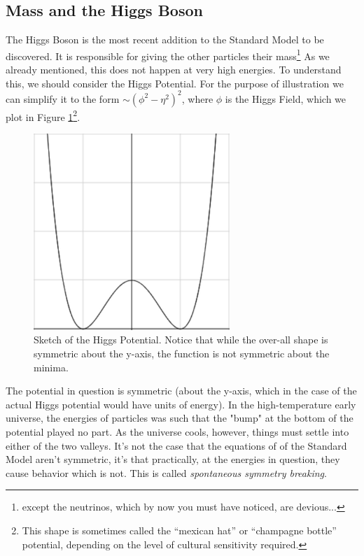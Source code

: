 \subsection{Mass and the Higgs Boson}
The Higgs Boson is the most recent addition to the Standard Model to be discovered. It is responsible for giving the other particles their mass\footnote{except the neutrinos, which by now you must have noticed, are devious...} As we already mentioned, this does not happen at very high energies. To understand this, we should consider the Higgs Potential. For the purpose of illustration we can simplify it to the form $\sim (\phi^2 - \eta^2)^2$, where $\phi$ is the Higgs Field, which we plot in Figure \ref{Fig:Intro:HiggsPot}\footnote{This shape is sometimes called the ``mexican hat'' or ``champagne bottle'' potential, depending on the level of cultural sensitivity required.}. 
\begin{figure}[h]
    \centering
        \includegraphics[width=0.66\textwidth]{F1/higsspot}
        \caption{Sketch of the Higgs Potential. Notice that while the over-all shape is symmetric about the y-axis, the function is not symmetric about the minima.}
        \label{Fig:Intro:HiggsPot}
\end{figure}
The potential in question is symmetric (about the y-axis, which in the case of the actual Higgs potential would have units of energy). In the high-temperature early universe, the energies of particles was such that the "bump" at the bottom of the potential played no part. As the universe cools, however, things must settle into either of the two valleys. It's not the case that the equations of of the Standard Model aren't symmetric, it's that practically, at the energies in question, they cause behavior which is not. This is called \textit{spontaneous symmetry breaking}.

